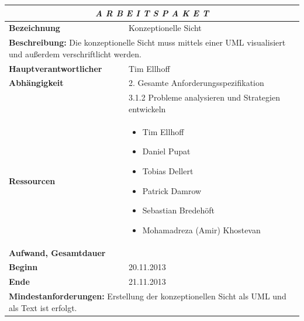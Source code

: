 \documentclass[fontsize=12pt,paper=a4,twoside]{scrartcl}
\begin{document}
\begin{tabular}{p{7.5cm}|p{7.5cm}}\toprule
\multicolumn{2}{c}{\textbf{\textit{A R B E I T S P A K E T \quad 3.2}}} \\ \toprule \hline
\textbf{Bezeichnung} & Konzeptionelle Sicht\\\hline
\multicolumn{2}{p{15cm}}{\textbf{Beschreibung:} \newline 
Die konzeptionelle Sicht muss mittels einer UML visualisiert und außerdem verschriftlicht werden.}  \\\hline
\textbf{Hauptverantwortlicher} & Tim Ellhoff \\\hline
\textbf{Abhängigkeit} & 2. Gesamte Anforderungsspezifikation \\ 
& 3.1.2 Probleme analysieren und Strategien entwickeln\\\hline
\textbf{Ressourcen} & \begin{itemize} 
\itemsep0pt
\item Tim Ellhoff
\item Daniel Pupat
\item Tobias Dellert
\item Patrick Damrow
\item Sebastian Bredehöft
\item Mohamadreza (Amir) Khostevan
\end{itemize} \\\hline
\textbf{Aufwand, Gesamtdauer} & \\\hline
\textbf{Beginn} & 20.11.2013 \\\hline
\textbf{Ende} & 21.11.2013\\\hline
\multicolumn{2}{p{15cm}}{\textbf{Mindestanforderungen: } \newline
Erstellung der konzeptionellen Sicht als UML und als Text ist erfolgt.}  \\ \toprule
\end{tabular} \\\\
\end{document}
